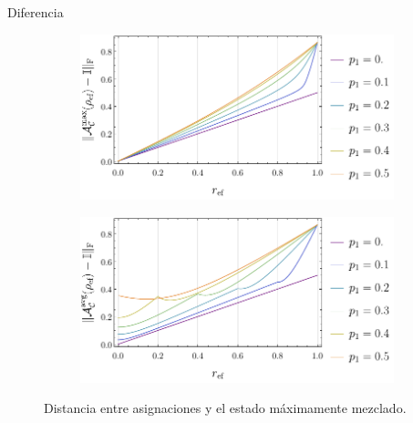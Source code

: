 \begin{frame}{Diferencia}
    \begin{figure}[ht!]
        \centering
        \begin{subfigure}{.45\textwidth}
          \centering
          \includegraphics[width=1.\linewidth]{figures/avg_results/dist_maxent_or_vs_p.pdf}
        \end{subfigure}%
        \begin{subfigure}{.45\textwidth}
          \centering
          \includegraphics[width=1.\linewidth]{figures/avg_results/dist_avg_or_vs_p.pdf}
        \end{subfigure}
        \caption{Distancia entre asignaciones y el estado máximamente mezclado.}
    \end{figure}
\end{frame}

